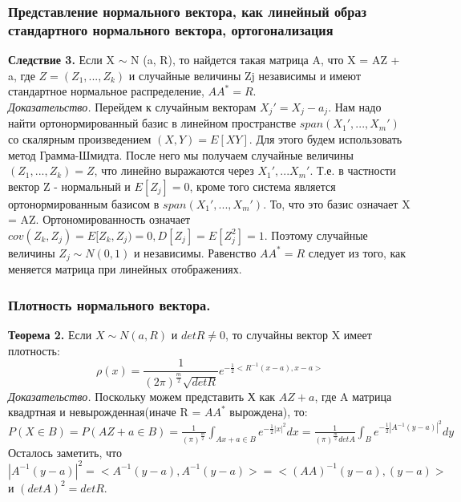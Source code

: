 \subsubsection{Представление нормального вектора, как линейный образ стандартного нормального вектора, ортогонализация}
\textbf{Следствие 3.} Если X $\sim$ N (a, R), то найдется такая матрица A, что X = AZ + a, где
$Z = (Z_1, ..., Z_k)$ и случайные величины Zj независимы и имеют стандартное нормальное распределение, $AA^* = R$.\\
\textit{Доказательство.} Перейдем к случайным векторам $X_j' = X_j - a_j$. Нам надо найти ортонормированный базис в линейном пространстве $span(X_1', ..., X_m')$ со скалярным произведением $(X, Y) = E[XY]$. Для этого будем использовать метод Грамма-Шмидта. После него мы получаем случайные величины $(Z_1, ..., Z_k) = Z$, что линейно выражаются через $X_1', ... X_m'$. Т.е. в частности вектор Z - нормальный и $E[Z_j] = 0$, кроме того система является ортонормированным базисом в $span(X_1', ..., X_m')$. То, что это базис означает X = AZ. Ортономированность означает $cov(Z_k, Z_j) = E[Z_k, Z_j) = 0, D[Z_j] = E[Z_j^2] = 1$. Поэтому случайные величины $Z_j \sim N(0, 1)$ и независимы. Равенство $AA^* = R$ следует из того, как меняется матрица при линейных отображениях.
\\
\subsubsection{Плотность нормального вектора.}
\textbf{Теорема 2.} Если $X\sim N(a, R)$ и $detR \neq 0$, то случайны вектор X имеет плотность:\\
$$\rho(x) = \frac{1}{(2\pi)^{\frac{m}{2}} \sqrt{detR}}e^{-\frac{1}{2}<R^{-1}(x - a), x - a>}$$
\textit{Доказательство.} Поскольку можем представить Х как $AZ + a$, где A матрица квадртная и невырожденная(иначе R = $AA^*$ вырождена), то:\\
$P(X \in B) = P(AZ + a \in B) = \frac{1}{(\pi)^{\frac{m}{2}}}\int_{Ax + a \in B} e^{-\frac{1}{2}|x|^2}dx = \frac{1}{(\pi)^{\frac{m}{2}}detA}\int_{B} e^{-\frac{1}{2}|A^{-1}(y - a)|^2}dy$\\
Осталось заметить, что $|A^{-1}(y - a)|^2 = <A^{-1}(y - a), A^{-1}(y - a)> = <(AA)^{-1}(y - a), (y - a)>$ и $(detA)^2 = detR$.
